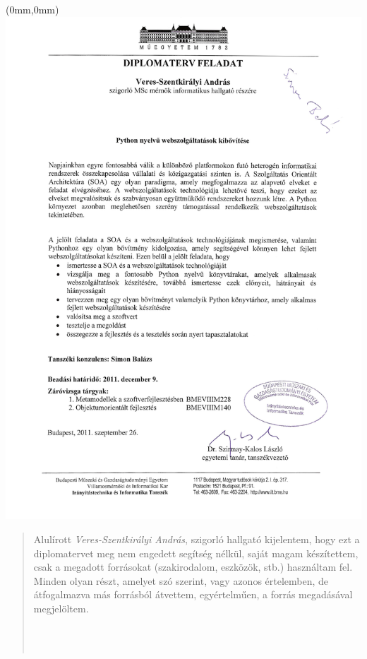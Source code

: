  \begin{textblock*}{\paperwidth}(0mm,0mm)
    \noindent\includegraphics[width=\paperwidth,height=\paperheight]{images/feladat-retouched.jpg}
	\end{textblock*}
	\mbox{}
 \blankpage

\def\abstractname{Nyilatkozat}
\begin{abstract}

\noindent
Alulírott \emph{Veres-Szentkirályi András}, szigorló hallgató kijelentem,
hogy ezt a diplomatervet meg nem engedett segítség nélkül, saját  magam
készítettem, csak a megadott forrásokat (szakirodalom, eszközök, stb.)
használtam fel. Minden olyan  részt, amelyet szó szerint, vagy azonos
értelemben, de átfogalmazva más forrásból átvettem, egyértelműen, a
forrás megadásával megjelöltem.

\begin{flushright}
 \vspace*{1cm}
 \makebox[7cm]{\rule{6cm}{.4pt}}\\
 \\
\end{flushright}
\end{abstract}


